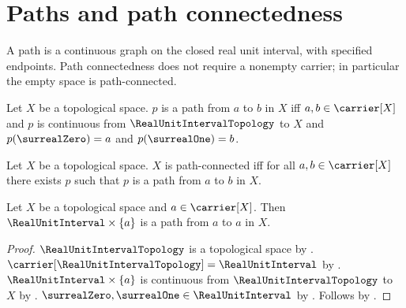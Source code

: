 \section{Paths and path connectedness}




A path is a continuous graph on the closed real unit interval, with specified
endpoints. Path connectedness does not require a nonempty carrier; in
particular the empty space is path-connected.

\begin{definition}\label{path_from_to}
    Let $X$ be a topological space.
    $p$ is a path from $a$ to $b$ in $X$ iff
        $a,b\in\carrier[X]$ and
        $p$ is continuous from $\RealUnitIntervalTopology$ to $X$ and
        $p(\surrealZero)=a$ and $p(\surrealOne)=b$.
\end{definition}

\begin{definition}\label{path_connected}
    Let $X$ be a topological space.
    $X$ is path-connected iff for all $a,b\in\carrier[X]$ there exists $p$
        such that $p$ is a path from $a$ to $b$ in $X$.
\end{definition}

\begin{theorem}\label{constant_path}
    Let $X$ be a topological space and $a\in\carrier[X]$.
    Then $\RealUnitInterval\times\{a\}$ is a path from $a$ to $a$ in $X$.
\end{theorem}
\begin{proof}
    $\RealUnitIntervalTopology$ is a topological space by
        .
    $\carrier[\RealUnitIntervalTopology]=\RealUnitInterval$ by
        .
    $\RealUnitInterval\times\{a\}$ is continuous from
        $\RealUnitIntervalTopology$ to $X$ by .
    $\surrealZero,\surrealOne\in\RealUnitInterval$ by
        .
    Follows by .
\end{proof}

